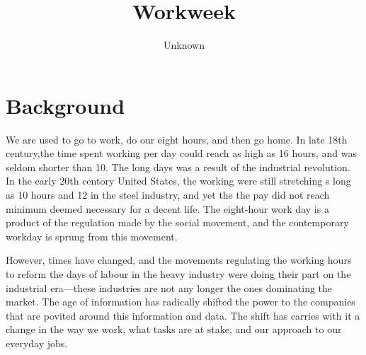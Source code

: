\documentclass[12pt, a4paper]{article}
\title{Workweek}
\author{Unknown}
\begin{document}
    \maketitle

    \section{Background}
    We are used to go to work, do our eight hours, and then go home. In late 18th century,the time spent working per day could reach as high as 16 hours, and was seldom shorter than 10. The long days was a result of the industrial revolution. In the early 20th centory United States, the working were still stretching s long as 10 hours and 12 in the steel industry, and yet the the pay did not reach minimum deemed necessary for a decent life.\cite{uslabor} 
    The eight-hour work day is a product of the regulation made by the social movement, and the contemporary workday is sprung from this movement.\cite{theeighthourday}

    However, times have changed, and the movements regulating the working hours to reform the days of labour in the heavy industry were doing their part on the industrial era---these industries are not any longer the ones dominating the market.
    The age of information has radically shifted the power to the companies that are povited around this information and data. The shift has carries with it a change in the way we work, what tasks are at stake, and our approach to our everyday jobs.
\end{document}
